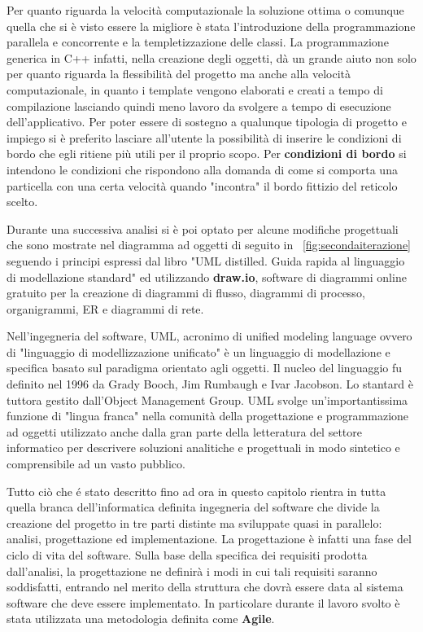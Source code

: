 Per quanto riguarda la velocit\`a computazionale la soluzione ottima o comunque quella che si \`e visto essere la migliore \`e stata l'introduzione della programmazione parallela e concorrente e la templetizzazione delle classi.
La programmazione generica in C++ infatti, nella creazione degli oggetti, d\`a un grande aiuto non solo per quanto riguarda la flessibilit\`a del progetto ma anche alla velocit\`a computazionale, in quanto i template vengono elaborati e creati a tempo di compilazione lasciando quindi meno lavoro da svolgere a tempo di esecuzione dell'applicativo.
Per poter essere di sostegno a qualunque tipologia di progetto e impiego si \`e preferito lasciare all'utente la possibilit\`a di inserire le condizioni di bordo che egli ritiene pi\`u utili per il proprio scopo. Per \textbf{condizioni di bordo} si intendono le condizioni che rispondono alla domanda di come si comporta una particella con una certa velocit\`a quando "incontra" il bordo fittizio del reticolo scelto.

Durante una successiva analisi si \`e poi optato per alcune modifiche progettuali che sono mostrate nel diagramma ad oggetti di seguito in \figurename~\ref{fig:secondaiterazione} seguendo i principi espressi dal libro "UML distilled. Guida rapida al linguaggio di modellazione standard"\cite{UML:10} ed utilizzando \textbf{draw.io}, software di diagrammi online gratuito per la creazione di diagrammi di flusso, diagrammi di processo, organigrammi, ER e diagrammi di rete.
\newpage

Nell'ingegneria del software, UML, acronimo di unified modeling language ovvero di "linguaggio di modellizzazione unificato" \`e un linguaggio di modellazione e specifica basato sul paradigma orientato agli oggetti. Il nucleo del linguaggio fu definito nel 1996 da Grady Booch, Jim Rumbaugh e Ivar Jacobson. Lo stantard \`e tuttora gestito dall'Object Management Group. UML svolge un'importantissima funzione di "lingua franca" nella comunit\`a della progettazione e programmazione ad oggetti utilizzato anche dalla gran parte della letteratura del settore informatico per descrivere soluzioni analitiche e progettuali in modo sintetico e comprensibile ad un vasto pubblico.

Tutto ci\`o che \'e stato descritto fino ad ora in questo capitolo rientra in tutta quella branca dell'informatica definita ingegneria del software che divide la creazione del progetto in tre parti distinte ma sviluppate quasi in parallelo: analisi, progettazione ed implementazione. La progettazione \`e infatti una fase del ciclo di vita del software. Sulla base della specifica dei requisiti prodotta dall'analisi, la progettazione ne definir\`a i modi in cui tali requisiti saranno soddisfatti, entrando nel merito della struttura che dovr\`a essere data al sistema software che deve essere implementato. In particolare durante il lavoro svolto \`e stata utilizzata una metodologia definita come \textbf{Agile}.


